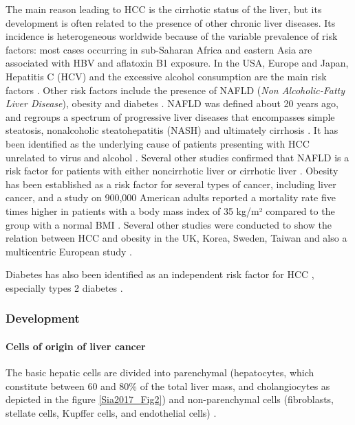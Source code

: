 \documentclass[]{article}
\let\oldparagraph\paragraph
\renewcommand{\paragraph}[1]{\oldparagraph{#1}\mbox{}}
\begin{document}
The main reason leading to HCC is the cirrhotic status of the
liver, but its development is often related to the presence of other
chronic liver diseases.
Its incidence is heterogeneous worldwide because of the variable
prevalence of risk factors: most cases occurring in sub-Saharan Africa
and eastern Asia are associated with HBV and aflatoxin B1
exposure. In the USA, Europe and Japan, Hepatitis C (HCV) and the
excessive alcohol consumption are the main risk factors \cite{Forner2018}. 
Other risk factors include the presence of NAFLD (\emph{Non Alcoholic-Fatty Liver
Disease}), obesity and diabetes \cite{Marengo2016}. 
NAFLD was defined about 20 years ago, and regroups a spectrum of
progressive liver diseases that encompasses simple steatosis,
nonalcoholic steatohepatitis (NASH) and ultimately cirrhosis
\cite{Marengo2016}. It has been identified as the
underlying cause of patients presenting with HCC unrelated to
virus and alcohol \cite{Marrero2002}.
Several other studies confirmed that NAFLD is a risk factor for
patients with either noncirrhotic liver \cite{Paradis2009, Dyson2014} or cirrhotic liver \cite{Wong2014, Ascha2010, Mittal2015}.
Obesity has been established as a risk factor for several types of
cancer, including liver cancer, and a study on 900,000 American adults
reported a mortality rate five times higher in patients with a body mass
index of 35 kg/m² compared to the group with a normal BMI \cite{Calle2003}. Several other studies were conducted to show
the relation between HCC and obesity in the UK, Korea, Sweden, Taiwan
and also a multicentric European study \cite{Chen2008, Schlesinger2012, Samanic2006, Oh2005, Batty2005}.

Diabetes has also been identified as an independent risk factor for HCC
\cite{Forner2018}, especially types 2 diabetes \cite{Noto2010,Wideroff1997,El-Serag2004,Davila2005,Inoue2006}.


\subsubsection*{Development}\label{development}

\paragraph{Cells of origin of liver cancer}\label{cells-of-origin-of-liver-cancer}

The basic hepatic cells are divided into parenchymal (hepatocytes, which
constitute between 60 and 80\% of the total liver mass, and
cholangiocytes as depicted in the figure \ref{Sia2017_Fig2}) and non-parenchymal
cells (fibroblasts, stellate cells, Kupffer cells, and endothelial
cells) \cite{Sia2017}.
\end{document}
